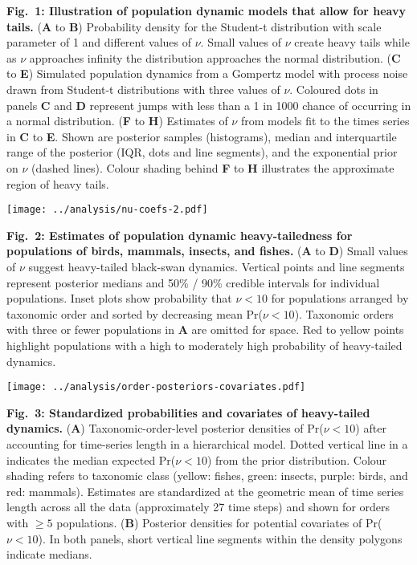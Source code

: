 \textbf{Fig.~1: Illustration of population dynamic models that allow for heavy tails.} (\textbf{A} to \textbf{B}) Probability density for the Student-t distribution with scale parameter of 1 and different values of \(\nu\). Small values of \(\nu\) create heavy tails while as \(\nu\) approaches infinity the distribution approaches the normal distribution. (\textbf{C} to \textbf{E}) Simulated population dynamics from a Gompertz model with process noise drawn from Student-t distributions with three values of \(\nu\). Coloured dots in panels \textbf{C} and \textbf{D} represent jumps with less than a 1 in 1000 chance of occurring in a normal distribution. (\textbf{F} to \textbf{H}) Estimates of \(\nu\) from models fit to the times series in \textbf{C} to \textbf{E}. Shown are posterior samples (histograms), median and interquartile range of the posterior (IQR, dots and line segments), and the exponential prior on \(\nu\) (dashed lines). Colour shading behind \textbf{F} to \textbf{H} illustrates the approximate region of heavy tails.

\clearpage

\begin{center}
\texttt{[image: ../analysis/nu-coefs-2.pdf]}
\end{center}

\textbf{Fig.~2: Estimates of population dynamic heavy-tailedness for populations of birds, mammals, insects, and fishes.} (\textbf{A} to \textbf{D}) Small values of \(\nu\) suggest heavy-tailed black-swan dynamics. Vertical points and line segments represent posterior medians and 50\% / 90\% credible intervals for individual populations. Inset plots show probability that \(\nu < 10\) for populations arranged by taxonomic order and sorted by decreasing mean Pr(\(\nu < 10\)). Taxonomic orders with three or fewer populations in \textbf{A} are omitted for space. Red to yellow points highlight populations with a high to moderately high probability of heavy-tailed dynamics.

\clearpage

\begin{center}
\texttt{[image: ../analysis/order-posteriors-covariates.pdf]}
\end{center}

\textbf{Fig.~3: Standardized probabilities and covariates of heavy-tailed dynamics.} (\textbf{A}) Taxonomic-order-level posterior densities of Pr(\(\nu < 10\)) after accounting for time-series length in a hierarchical model. Dotted vertical line in a indicates the median expected Pr(\(\nu < 10\)) from the prior distribution. Colour shading refers to taxonomic class (yellow: fishes, green: insects, purple: birds, and red: mammals). Estimates are standardized at the geometric mean of time series length across all the data (approximately 27 time steps) and shown for orders with \(\ge 5\) populations. (\textbf{B}) Posterior densities for potential covariates of Pr(\(\nu < 10\)). In both panels, short vertical line segments within the density polygons indicate medians.

